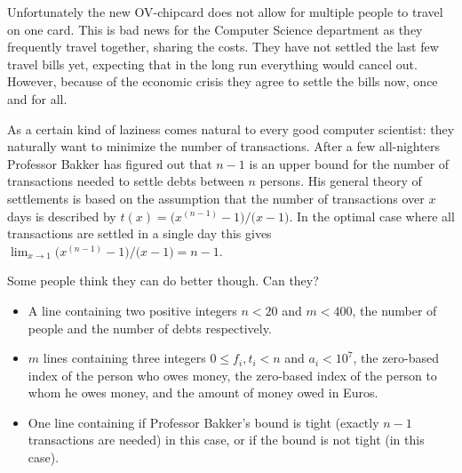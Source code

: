 


\def\BillHero{Professor Bakker}

{\StandaardZin}
Unfortunately the new OV-chipcard does not allow for multiple people to travel on one card.
This is bad news for the Computer Science department as they frequently travel together, sharing the costs.
They have not settled the last few travel bills yet, expecting that in the long run everything would cancel out.
However, because of the economic crisis they agree to settle the bills now, once and for all.


As a certain kind of laziness comes natural to every good computer scientist: they naturally want to minimize the number of transactions.
After a few all-nighters {\BillHero} has figured out that $n-1$ is an upper bound for the number of transactions needed to settle debts between $n$ persons.
His general theory of settlements is based on the assumption that the number of transactions over $x$ days is described by %
$t(x) = \bigl(x^{(n-1)}-1\bigr)/\bigl(x-1\bigr)$.
In the optimal case where all transactions are settled in a single day this gives $\lim_{x\rightarrow 1}\bigl(x^{(n-1)}-1\bigr)/\bigl(x-1\bigr)=n-1$.

Some people think they can do better though.
Can they?

\Input
\begin{itemize}
 \item A line containing two positive integers $n < 20$ and $m < 400$, the number of people and the number of debts respectively.
 \item $m$ lines containing three integers $0 \leq f_i, t_i < n$ and $a_i < 10^7$, the zero-based index of the person who owes money, the zero-based index of the person to whom he owes money, and the amount of money owed in Euros.
\end{itemize}

\Output
\begin{itemize}
 \item One line containing  if {\BillHero}'s bound is tight (exactly $n-1$ transactions are needed) in this case, or  if the bound is not tight (in this case).
\end{itemize}

\Example
